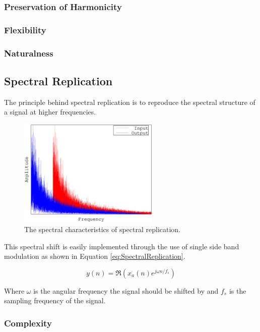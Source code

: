 		\subsubsection*{Preservation of Harmonicity}
		\subsubsection*{Flexibility}
		\subsubsection*{Naturalness}

	\subsection{Spectral Replication}
	\label{sec:Excitation-SpectralReplication}
		The principle behind spectral replication is to reproduce the spectral structure of a signal at higher
		frequencies.

		\begin{figure}[h!]
			\centering
			\includegraphics[width=0.6\textwidth]{chapter3/Images/SpectralReplication.eps}
			\caption{The spectral characteristics of spectral replication.}
			\label{fig:SpectralReplication}
		\end{figure}

		This spectral shift is easily implemented through the use of single side band modulation as shown in
		Equation \ref{eq:SpectralReplication}.

		\begin{equation}
			y(n) = \Re \left( x_{a}(n) e^{j\omega  n/ f_{s}} \right)
			\label{eq:SpectralReplication}
		\end{equation}

		Where $\omega$ is the angular frequency the signal should be shifted by and $f_{s}$ is the sampling
		frequency of the signal.

		\subsubsection*{Complexity}
